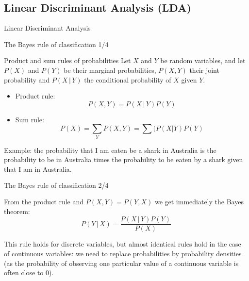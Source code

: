 \documentclass[xcolor=pdftex,dvipsnames,table]{beamer}
\begin{document}
\subsection{Linear Discriminant Analysis (LDA)}
\begin{frame}[plain,c]
\begin{center}
\Huge Linear Discriminant Analysis
\end{center}
\end{frame}


\begin{frame}{The Bayes rule of classification 1/4}
\begin{block}{Product and sum rules of probabilities}
	Let $X$ and $Y$ be random variables, and let $P(X)$ and $P(Y)$ be their marginal probabilities, $P(X,Y)$ their joint probability and $P(X\,|\,Y)$ the conditional probability of $X$ given $Y$.
	\begin{itemize}
		\item Product rule:
		\begin{equation}
			P(X,Y) = P(X\,|\,Y)P(Y)
		\end{equation}
		\item Sum rule:
		\begin{equation}
			P(X) = \sum_Y P(X,Y) = \sum(P(X|Y)P(Y)
		\end{equation}
	\end{itemize}
\end{block}
Example: the probability that I am eaten be a shark in Australia is the probability to be in Australia times the probability to be eaten by a shark given that I am in Australia. 
\end{frame}

\begin{frame}{The Bayes rule of classification 2/4}

From the product rule and $P(X,Y)=P(Y,X)$ we get immediately the Bayes theorem:
\begin{equation}
	P(Y \, | \, X) = \frac{P(X \, | \, Y)P(Y)}{P(X)}
\end{equation}

This rule holds for discrete variables, but almost identical rules hold in the case of continuous variables: we need to replace probabilities by probability densities (as the probability of observing one particular value of a continuous variable is often close to 0).


\end{frame}
\end{document}
